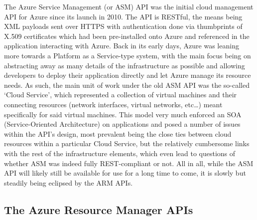 \documentclass[11pt]{report}
\begin{document}
The Azure Service Management (or ASM) API was the initial cloud management API
for Azure since its launch in 2010. The API is RESTful, the means being XML
payloads sent over HTTPS with authentication done via thumbprints of X.509
certificates which had been pre-installed onto Azure and referenced in the
application interacting with Azure.
Back in its early days, Azure was leaning more towards a Platform as a
Service-type system, with the main focus being on abstracting
away as many details of the infrastructure as possible and allowing developers
to deploy their application directly and let Azure manage its resource needs.
\newline
As such, the main unit of work under the old ASM API was the so-called `Cloud
Service', which represented a collection of virtual machines and their
connecting resources (network interfaces, virtual networks, etc\ldots) meant
specifically for said virtual machines. This model very much enforced an SOA
(Service-Oriented Architecture) on applications and posed a number of issues
within the API's design, most prevalent being the close ties between cloud
resources within a particular Cloud Service, but the relatively cumbersome
links with the rest of the infrastructure elements, which even lead to
questions of whether ASM was indeed fully REST-compliant or not. \newline
All in all, while the ASM API will likely still be available for use for a long
time to come, it is slowly but steadily being eclipsed by the ARM APIs.


\subsection{The Azure Resource Manager APIs}
\end{document}
